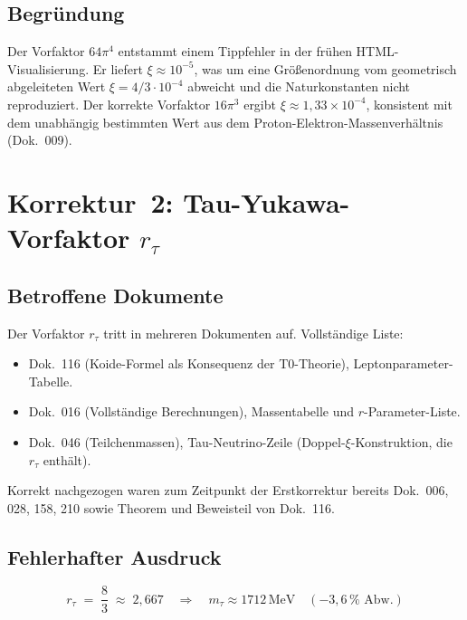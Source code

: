 \subsection*{Begründung}

Der Vorfaktor $64\pi^4$ entstammt einem Tippfehler in der frühen
HTML-Visualisierung. Er liefert $\xi \approx 10^{-5}$, was um eine
Größenordnung vom geometrisch abgeleiteten Wert
$\xi = 4/3 \cdot 10^{-4}$ abweicht und die Naturkonstanten nicht
reproduziert. Der korrekte Vorfaktor $16\pi^3$ ergibt
$\xi \approx 1{,}33 \times 10^{-4}$, konsistent mit dem unabhängig
bestimmten Wert aus dem Proton-Elektron-Massenverhältnis (Dok.~009).

\section{\texorpdfstring{Korrektur~2: Tau-Yukawa-Vorfaktor $r_\tau$}{Korrektur 2: Tau-Yukawa-Vorfaktor r-tau}}

\subsection*{Betroffene Dokumente}

Der Vorfaktor $r_\tau$ tritt in mehreren Dokumenten auf. Vollständige Liste:
\begin{itemize}
  \item Dok.~116 (Koide-Formel als Konsequenz der T0-Theorie),
        Leptonparameter-Tabelle.
  \item Dok.~016 (Vollständige Berechnungen), Massentabelle und
        $r$-Parameter-Liste.
  \item Dok.~046 (Teilchenmassen), Tau-Neutrino-Zeile
        (Doppel-$\xi$-Konstruktion, die $r_\tau$ enthält).
\end{itemize}
Korrekt nachgezogen waren zum Zeitpunkt der Erstkorrektur bereits
Dok.~006, 028, 158, 210 sowie Theorem und Beweisteil von Dok.~116.

\subsection*{Fehlerhafter Ausdruck}

\begin{equation}
  r_\tau \;=\; \frac{8}{3} \;\approx\; 2{,}667
  \quad \Rightarrow \quad
  m_\tau \approx 1712\,\text{MeV} \quad (-3{,}6\,\% \text{ Abw.})
  \tag{alt -- falsch}
\end{equation}

